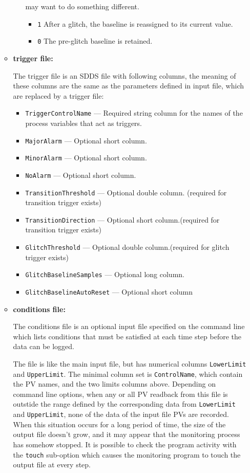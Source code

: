 \begin{itemize}
\begin{itemize}
\begin{itemize}
                may want to do something different. 
 \begin{itemize}       
        \item {\tt 1}   After a glitch, the baseline is reassigned to its current value.
        \item {\tt 0}   The pre-glitch baseline is retained. 
\end{itemize}
\end{itemize}
\item {\bf trigger file:}\par
The trigger file is an SDDS file with following columns, the meaning of these columns are the same as
the parameters defined in input file, which are replaced by a trigger file:
\begin{itemize}
        \item {\tt TriggerControlName} --- Required string column for the names of the process variables
                that act as triggers.
        \item {\tt MajorAlarm} --- Optional short column.
        \item {\tt MinorAlarm} --- Optional short column.
        \item {\tt NoAlarm} --- Optional short column.
        \item {\tt TransitionThreshold} --- Optional double column. (required for transition trigger exists)
        \item {\tt TransitionDirection} --- Optional short column.(required for transition trigger exists)
        \item {\tt GlitchThreshold} --- Optional double column.(required for glitch trigger exists)
        \item {\tt GlitchBaselineSamples} --- Optional long column.
        \item {\tt GlitchBaselineAutoReset} --- Optional short column
\end{itemize}
\item {\bf conditions file:} \par
The conditions file is an optional input file specified on the command line which lists
conditions that must be satisfied at each time step before the data can be logged.

The file is like the main input file, but has numerical columns \verb+LowerLimit+ and \verb+UpperLimit+.
The minimal column set is \verb+ControlName+, which contain the PV names, and the two limits columns above.
Depending on command line options, when any or all PV readback from this file
is outstide the range defined by the corresponding data from \verb+LowerLimit+ and \verb+UpperLimit+,
none of the data of the input file PVs are recorded. 
When this situation occurs for a long period of time, the size of the output file doesn't
grow, and it may appear that the monitoring process has somehow stopped.
It is possible to check the program activity with the \verb+touch+ sub-option
which causes the monitoring program to touch the output file at every step.


\end{itemize}
\end{itemize}

